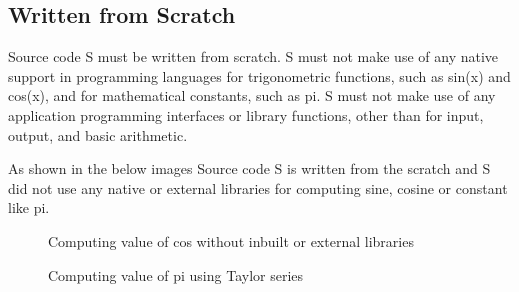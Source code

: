 \subsection{Written from Scratch}
\begin{flushleft}
    Source code S must be written from scratch. S must not make use of any native support in programming languages for trigonometric functions, such as sin(x) and cos(x), and for mathematical constants, such as pi. S must not make use of any application programming interfaces or library functions, other than for input, output, and basic arithmetic.
\end{flushleft}
\begin{flushleft}
    As shown in the below images Source code S is written from the scratch and S did not use any native or external libraries for computing sine, cosine or constant like pi.
\end{flushleft}
\begin{figure}[h!]
    \centering
    \vspace{.5cm}
    \caption{Computing value of cos without inbuilt or external libraries}
    \label{fig:cos }
  \end{figure}
  \begin{figure}[h!]
    \centering
    \vspace{.5cm}
    \caption{Computing value of pi using Taylor series}
    \label{fig:pi }
  \end{figure}
  \pagebreak
